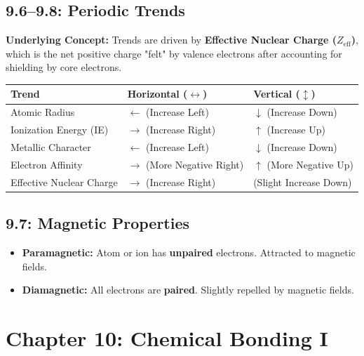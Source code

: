 \documentclass[11pt]{article}
\begin{document}
\subsection{9.6--9.8: Periodic Trends}
\textbf{Underlying Concept:} Trends are driven by \textbf{Effective Nuclear Charge ($Z_{\text{eff}}$)}, which is the net positive charge "felt" by valence electrons after accounting for shielding by core electrons.

\begin{tcolorbox}[colframe=conceptgold, title=Visualizing Trends (Arrows point toward INCREASE)]
    \begin{center}
        \begin{tabular}{l l l}
            \textbf{Trend} & \textbf{Horizontal ($\leftrightarrow$)} & \textbf{Vertical ($\updownarrow$)} \\ \midrule
            Atomic Radius & $\longleftarrow$ (Increase Left) & $\downarrow$ (Increase Down) \\
            Ionization Energy (IE) & $\longrightarrow$ (Increase Right) & $\uparrow$ (Increase Up) \\
            Metallic Character & $\longleftarrow$ (Increase Left) & $\downarrow$ (Increase Down) \\
            Electron Affinity & $\longrightarrow$ (More Negative Right) & $\uparrow$ (More Negative Up) \\
            Effective Nuclear Charge & $\longrightarrow$ (Increase Right) & (Slight Increase Down) \\ \bottomrule
        \end{tabular}
    \end{center}
\end{tcolorbox}

\subsection{9.7: Magnetic Properties}
\begin{itemize}
    \item \textbf{Paramagnetic:} Atom or ion has \textbf{unpaired} electrons. Attracted to magnetic fields.
    \item \textbf{Diamagnetic:} All electrons are \textbf{paired}. Slightly repelled by magnetic fields.
\end{itemize}

\section{Chapter 10: Chemical Bonding I}
\end{document}
